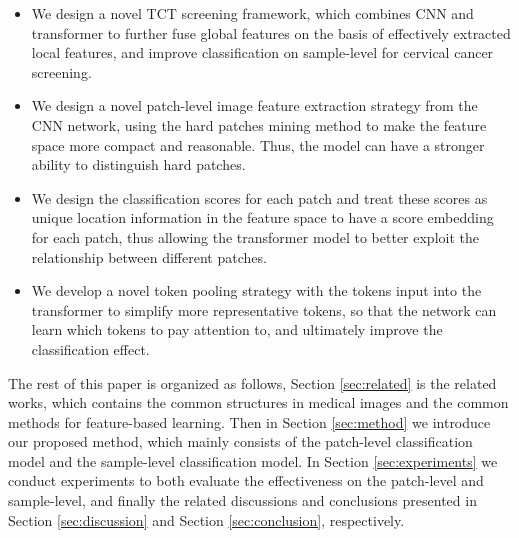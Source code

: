 \begin{itemize}
    \item We design a novel TCT screening framework, which combines CNN and transformer to further fuse global features on the basis of effectively extracted local features, 
    and improve classification on sample-level for cervical cancer screening.
    \item We design a novel patch-level image feature extraction strategy from the CNN network, using the hard patches mining method to make the feature space more compact and reasonable. Thus, the model can have a stronger ability to distinguish hard patches.
    \item We design the classification scores for each patch and treat these scores as unique location information in the feature space to have a score embedding for each patch, thus allowing the transformer model to better exploit the relationship between different patches.
    \item We develop a novel token pooling strategy with the tokens input into the transformer to simplify more representative tokens, so that the network can learn which tokens to pay attention to, and ultimately improve the classification effect.
\end{itemize}

The rest of this paper is organized as follows, Section \ref{sec:related} is the related works, which contains the common structures in medical images and the common methods for feature-based learning. Then in Section \ref{sec:method} we introduce our proposed method, which mainly consists of the patch-level classification model and the sample-level classification model. In Section \ref{sec:experiments} we conduct experiments to both evaluate the effectiveness on the patch-level and sample-level, and finally the related discussions and conclusions presented in Section \ref{sec:discussion} and Section \ref{sec:conclusion}, respectively.

